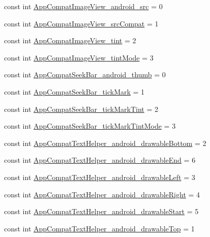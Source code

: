 \begin{CompactItemize}
\item 
const int \hyperlink{class__2doo_1_1_droid_1_1_resource_1_1_styleable_beee12b0d0961fcbf5bbbd0c4f27604b}{AppCompatImageView\_\-android\_\-src} = 0
\item 
const int \hyperlink{class__2doo_1_1_droid_1_1_resource_1_1_styleable_0e2ce95d38c84779663a570cca41974a}{AppCompatImageView\_\-srcCompat} = 1
\item 
const int \hyperlink{class__2doo_1_1_droid_1_1_resource_1_1_styleable_d6dfa587c1d8ee3898bf0731d657b752}{AppCompatImageView\_\-tint} = 2
\item 
const int \hyperlink{class__2doo_1_1_droid_1_1_resource_1_1_styleable_f75a18b08470dc63cae7024f1338776b}{AppCompatImageView\_\-tintMode} = 3
\item 
const int \hyperlink{class__2doo_1_1_droid_1_1_resource_1_1_styleable_5af227b0195598c26ce1ee857ce681c8}{AppCompatSeekBar\_\-android\_\-thumb} = 0
\item 
const int \hyperlink{class__2doo_1_1_droid_1_1_resource_1_1_styleable_122b31aff25a2112c545ea7da7a599c2}{AppCompatSeekBar\_\-tickMark} = 1
\item 
const int \hyperlink{class__2doo_1_1_droid_1_1_resource_1_1_styleable_641a3f3ecb4817ed488ba872fa159176}{AppCompatSeekBar\_\-tickMarkTint} = 2
\item 
const int \hyperlink{class__2doo_1_1_droid_1_1_resource_1_1_styleable_b88344471d489534bda89f113348443f}{AppCompatSeekBar\_\-tickMarkTintMode} = 3
\item 
const int \hyperlink{class__2doo_1_1_droid_1_1_resource_1_1_styleable_7c9cf9c5b80d9ecfd2fd68ee386cd5b7}{AppCompatTextHelper\_\-android\_\-drawableBottom} = 2
\item 
const int \hyperlink{class__2doo_1_1_droid_1_1_resource_1_1_styleable_d1b38325a9dcd3d6cb0c4426ee0eb133}{AppCompatTextHelper\_\-android\_\-drawableEnd} = 6
\item 
const int \hyperlink{class__2doo_1_1_droid_1_1_resource_1_1_styleable_caaa08152c5a2af4acfc2f9147cf5e9d}{AppCompatTextHelper\_\-android\_\-drawableLeft} = 3
\item 
const int \hyperlink{class__2doo_1_1_droid_1_1_resource_1_1_styleable_e2242b7c674f3ef2c60c5d310b371a2f}{AppCompatTextHelper\_\-android\_\-drawableRight} = 4
\item 
const int \hyperlink{class__2doo_1_1_droid_1_1_resource_1_1_styleable_4600d0d35254a6ee878702e1e28bb98d}{AppCompatTextHelper\_\-android\_\-drawableStart} = 5
\item 
const int \hyperlink{class__2doo_1_1_droid_1_1_resource_1_1_styleable_e39a330161783b405d1548a536531e55}{AppCompatTextHelper\_\-android\_\-drawableTop} = 1

\end{CompactItemize}

